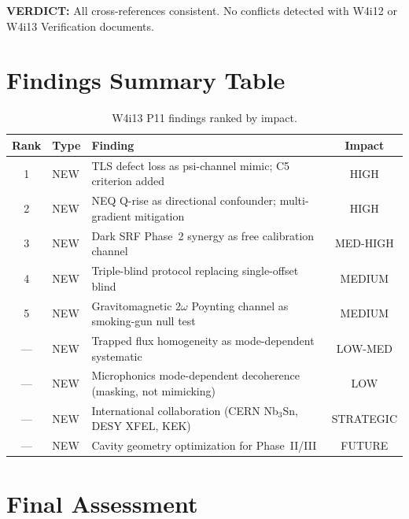 \documentclass[11pt]{article}
\newcommand{\verdict}[1]{\textcolor{green!50!black}{\textbf{VERDICT:} #1}}
\theoremstyle{definition}
\theoremstyle{remark}
\begin{document}
\verdict{All cross-references consistent. No conflicts detected with
W4i12 or W4i13 Verification documents.}


\section{Findings Summary Table}

\begin{table}[H]
\centering
\caption{W4i13 P11 findings ranked by impact.}
\label{tab:findings_summary}
\renewcommand{\arraystretch}{1.3}
\begin{tabular}{@{}clp{7cm}c@{}}
\toprule
\textbf{Rank} & \textbf{Type} & \textbf{Finding} & \textbf{Impact} \\
\midrule
1 & NEW & TLS defect loss as psi-channel mimic; C5 criterion added &
  HIGH \\
2 & NEW & NEQ Q-rise as directional confounder; multi-gradient
  mitigation & HIGH \\
3 & NEW & Dark SRF Phase~2 synergy as free calibration channel &
  MED-HIGH \\
4 & NEW & Triple-blind protocol replacing single-offset blind &
  MEDIUM \\
5 & NEW & Gravitomagnetic $2\omega$ Poynting channel as smoking-gun
  null test & MEDIUM \\
\midrule
--- & NEW & Trapped flux homogeneity as mode-dependent systematic &
  LOW-MED \\
--- & NEW & Microphonics mode-dependent decoherence (masking, not
  mimicking) & LOW \\
--- & NEW & International collaboration (CERN Nb$_3$Sn, DESY XFEL,
  KEK) & STRATEGIC \\
--- & NEW & Cavity geometry optimization for Phase~II/III &
  FUTURE \\
\bottomrule
\end{tabular}
\end{table}


\section{Final Assessment}
\end{document}
